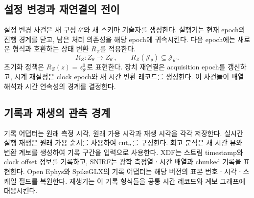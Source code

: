 \subsection{설정 변경과 재연결의 전이}
설정 변경 사건은 새 구성 $\theta'$와 새 스키마 기술자를 생성한다.
실행기는 현재 epoch의 진행 경계를 닫고, 남은 처리 의존성을 해당 epoch에 귀속시킨다.
다음 epoch에는 새로운 형식과 호환하는 상태 변환 $R_Z$를 적용한다.
\begin{equation}
 R_Z:Z_{\theta}\longrightarrow Z_{\theta'},\qquad
 R_Z(\mathcal J_{\theta})\subseteq\mathcal J_{\theta'}.
\end{equation}
초기화 정책은 $R_Z(z)=z^0_{\theta'}$로 표현한다.
장치 재연결은 acquisition epoch를 갱신하고, 시계 재설정은 clock epoch와
새 시간 변환 레코드를 생성한다. 이 사건들이 배열 해석과 시간 연속성의 경계를 결정한다.

\subsection{기록과 재생의 관측 경계}
기록 어댑터는 원래 측정 시각, 원래 가용 시각과 재생 시각을 각각 저장한다.
실시간 실행 재생은 원래 가용 순서를 사용하여 $\operatorname{cut}_u$를 구성한다.
회고 분석은 새 시간 뷰와 변환 계보를 생성하여 기록 구간을 입력으로 사용한다.
XDF는 스트림 timestamp와 clock offset 정보를 기록하고\cite{xdf,lsl_time},
SNIRF는 광학 측정열ㆍ시간 배열과 chunked 기록을 표현한다\cite{snirf}.
Open Ephys와 SpikeGLX의 기록 어댑터는 해당 버전의 표본 번호ㆍ시각ㆍ스케일 필드를
복원한다\cite{open_ephys_binary,spikeglx_metadata}.
재생기는 이 기록 형식들을 공통 시간 레코드와 계보 그래프에 대응시킨다.

